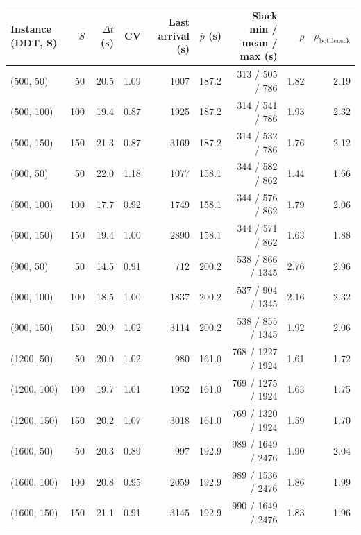\begin{tabular}{lrrrrrrrr}
\toprule
Instance (DDT, S) & $S$ & $\bar{\Delta t}$ (s) & CV & Last arrival (s) & $\bar{p}$ (s) & Slack min / mean / max (s) & $\rho$ & $\rho_{\mathrm{bottleneck}}$ \\
\midrule
(500, 50) & 50 & 20.5 & 1.09 & 1007 & 187.2 & 313 / 505 / 786 & 1.82 & 2.19 \\
(500, 100) & 100 & 19.4 & 0.87 & 1925 & 187.2 & 314 / 541 / 786 & 1.93 & 2.32 \\
(500, 150) & 150 & 21.3 & 0.87 & 3169 & 187.2 & 314 / 532 / 786 & 1.76 & 2.12 \\
(600, 50) & 50 & 22.0 & 1.18 & 1077 & 158.1 & 344 / 582 / 862 & 1.44 & 1.66 \\
(600, 100) & 100 & 17.7 & 0.92 & 1749 & 158.1 & 344 / 576 / 862 & 1.79 & 2.06 \\
(600, 150) & 150 & 19.4 & 1.00 & 2890 & 158.1 & 344 / 571 / 862 & 1.63 & 1.88 \\
(900, 50) & 50 & 14.5 & 0.91 & 712 & 200.2 & 538 / 866 / 1345 & 2.76 & 2.96 \\
(900, 100) & 100 & 18.5 & 1.00 & 1837 & 200.2 & 537 / 904 / 1345 & 2.16 & 2.32 \\
(900, 150) & 150 & 20.9 & 1.02 & 3114 & 200.2 & 538 / 855 / 1345 & 1.92 & 2.06 \\
(1200, 50) & 50 & 20.0 & 1.02 & 980 & 161.0 & 768 / 1227 / 1924 & 1.61 & 1.72 \\
(1200, 100) & 100 & 19.7 & 1.01 & 1952 & 161.0 & 769 / 1275 / 1924 & 1.63 & 1.75 \\
(1200, 150) & 150 & 20.2 & 1.07 & 3018 & 161.0 & 769 / 1320 / 1924 & 1.59 & 1.70 \\
(1600, 50) & 50 & 20.3 & 0.89 & 997 & 192.9 & 989 / 1649 / 2476 & 1.90 & 2.04 \\
(1600, 100) & 100 & 20.8 & 0.95 & 2059 & 192.9 & 989 / 1536 / 2476 & 1.86 & 1.99 \\
(1600, 150) & 150 & 21.1 & 0.91 & 3145 & 192.9 & 990 / 1649 / 2476 & 1.83 & 1.96 \\
\bottomrule
\end{tabular}
